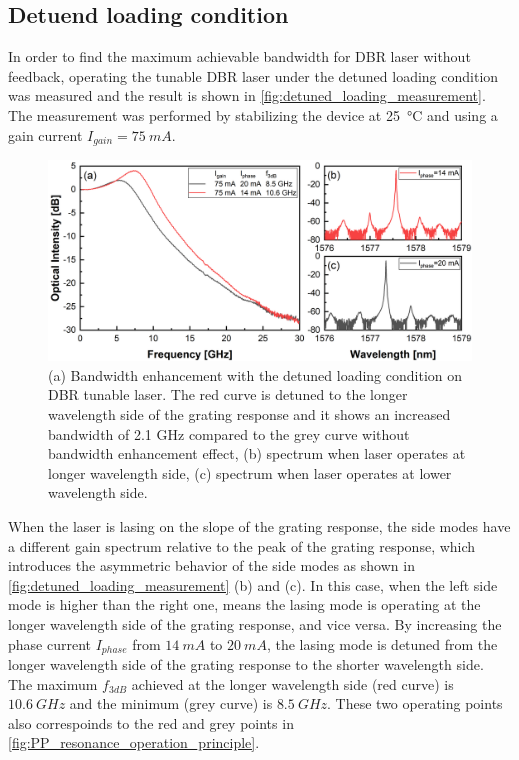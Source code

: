 \subsection{Detuend loading condition}\label{subsec:detuned_laoding_measurement}
In order to find the maximum achievable bandwidth for DBR laser without feedback, operating the tunable DBR laser under the detuned loading condition was measured and the result is shown in \autoref{fig:detuned_loading_measurement}. The measurement was performed by stabilizing the device at \SI{25}{\celsius} and using a gain current $I_{gain}=75 \ mA$. 


\begin{figure}[ht]
    \centering
    \includegraphics[width=\linewidth]{figures/detuned_loading.png}
    \caption{(a) Bandwidth enhancement with the detuned loading condition on DBR tunable laser. The red curve is detuned to the longer wavelength side of the grating response and it shows an increased bandwidth of 2.1 GHz compared to the grey curve without bandwidth enhancement effect, (b) spectrum when laser operates at longer wavelength side, (c) spectrum when laser operates at lower wavelength side.}
    \label{fig:detuned_loading_measurement}
\end{figure}

When the laser is lasing on the slope of the grating response, the side modes have a different gain spectrum relative to the peak of the grating response, which introduces the asymmetric behavior of the side modes as shown in \autoref{fig:detuned_loading_measurement} (b) and (c). In this case, when the left side mode is higher than the right one, means the lasing mode is operating at the longer wavelength side of the grating response, and vice versa. By increasing the phase current $I_{phase}$ from $14 \ mA$ to $20 \ mA$, the lasing mode is detuned from the longer wavelength side of the grating response to the shorter wavelength side. The maximum $f_{3dB}$ achieved at the longer wavelength side (red curve) is $10.6 \ GHz$ and the minimum (grey curve) is $8.5 \ GHz$. These two operating points also correspoinds to the red and grey points in \autoref{fig:PP_resonance_operation_principle}.

